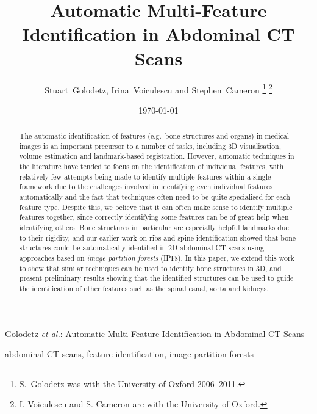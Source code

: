 \documentclass[10pt,twocolumn,twoside]{IEEEtran}
\begin{document}
\title{Automatic Multi-Feature Identification in Abdominal CT Scans}

\author{Stuart~Golodetz, Irina~Voiculescu and Stephen~Cameron%
\thanks{S.~Golodetz was with the University of Oxford 2006--2011.}%
\thanks{I. Voiculescu and S. Cameron are with the University of Oxford.}}

\date{\today}

%
{Golodetz \MakeLowercase{\textit{et al.}}: Automatic Multi-Feature Identification in Abdominal CT Scans}


\maketitle

\begin{abstract}
\noindent The automatic identification of features (e.g.~bone structures and organs) in medical images is an important precursor to a number of tasks, including 3D visualisation, volume estimation and landmark-based registration. However, automatic techniques in the literature have tended to focus on the identification of individual features, with relatively few attempts being made to identify multiple features within a single framework due to the challenges involved in identifying even individual features automatically and the fact that techniques often need to be quite specialised for each feature type. Despite this, we believe that it can often make sense to identify multiple features together, since correctly identifying some features can be of great help when identifying others. Bone structures in particular are especially helpful landmarks due to their rigidity, and our earlier work on ribs and spine identification showed that bone structures could be automatically identified in 2D abdominal CT scans using approaches based on \emph{image partition forests} (IPFs). In this paper, we extend this work to show that similar techniques can be used to identify bone structures in 3D, and present preliminary results showing that the identified structures can be used to guide the identification of other features such as the spinal canal, aorta and kidneys.
\end{abstract}

\begin{IEEEkeywords}
abdominal CT scans, feature identification, image partition forests
\end{IEEEkeywords}
\end{document}
